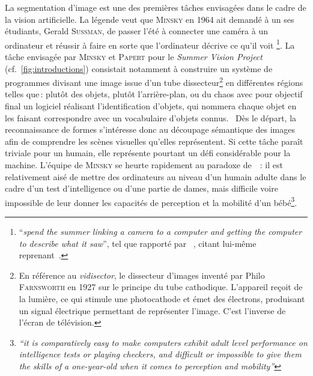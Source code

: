 La segmentation d'image est une des premières tâches envisagées dans le cadre de la vision artificielle.
La légende veut que \textsc{Minsky} en 1964 ait demandé à un ses étudiants, Gerald \textsc{Sussman}, de \og passer l'été à connecter une caméra à un ordinateur et réussir à faire en sorte que l'ordinateur décrive ce qu'il voit \fg\footnote{``\emph{spend the summer linking a camera to a computer and getting the computer to describe what it saw}'', tel que rapporté par ~\citet{szeliski_computer_2011}, citant lui-même~\citet{boden_mind_2008} reprenant~\citet{crevier_ai_1993}.}.
La tâche envisagée par \textsc{Minsky} et \textsc{Papert} pour le \emph{Summer Vision Project} (cf.~\cref{fig:introductions}) consistait notamment à \og construire un système de programmes divisant une image issue d'un tube dissecteur\footnote{En référence au \emph{vidisector}, le dissecteur d'images inventé par Philo \textsc{Farnsworth} en 1927 sur le principe du tube cathodique. L'appareil reçoit de la lumière, ce qui stimule une photocathode et émet des électrons, produisant un signal électrique permettant de représenter l'image. C'est l'inverse de l'écran de télévision.} en différentes régions telles que\,: plutôt des objets, plutôt l'arrière-plan, ou du chaos\fg{} avec pour objectif final un logiciel réalisant \og l'identification d'objets, qui nommera chaque objet en les faisant correspondre avec un vocabulaire d'objets connus.\fg{}~\cite{papert_summer_1966}
Dès le départ, la reconnaissance de formes s'intéresse donc au découpage sémantique des images afin de comprendre les scènes visuelles qu'elles représentent.
Si cette tâche paraît triviale pour un humain, elle représente pourtant un défi considérable pour la machine. L'équipe de \textsc{Minsky} se heurte rapidement au paradoxe de ~\citet{moravec_mind_1988}\,: \og il est relativement aisé de mettre des ordinateurs au niveau d'un humain adulte dans le cadre d'un test d'intelligence ou d'une partie de dames, mais difficile voire impossible de leur donner les capacités de perception et la mobilité d'un bébé\fg{}\footnote{\emph{``it is comparatively easy to make computers exhibit adult level performance on intelligence tests or playing checkers, and difficult or impossible to give them the skills of a one-year-old when it comes to perception and mobility''}}.

